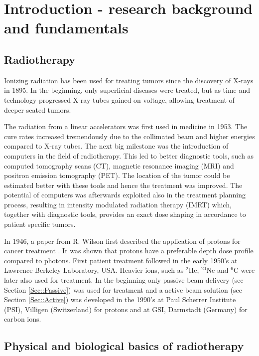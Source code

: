 \chapter{Introduction - research background and fundamentals}
\label{chapter:intro}
\minitoc

\section{Radiotherapy}

Ionizing radiation has been used for treating tumors since the discovery of X-rays in 1895. In the beginning, only superficial diseases were treated, but as time and technology progressed X-ray tubes gained on voltage, allowing treatment of deeper seated tumors.

The radiation from a linear accelerators was first used in medicine in 1953. The cure rates increased tremendously due to the collimated beam and higher energies compared to X-ray tubes. The next big milestone was the introduction of computers in the field
of radiotherapy. This led to better diagnostic tools, such as computed tomography scans (CT), magnetic resonance imaging (MRI) and
positron emission tomography (PET). The location of the tumor could be estimated better with these tools and hence the treatment was improved. The potential of computers was afterwards exploited also in the treatment planning process, resulting in intensity modulated
radiation therapy (IMRT) which, together with diagnostic tools, provides an exact dose shaping in accordance to patient specific tumors.

In 1946, a paper from R. Wilson first described the application of protons for cancer treatment \cite{Wilson1946}. It was shown that protons have a preferable depth dose profile compared to photons. First patient treatment followed in the early 1950's at Lawrence Berkeley Laboratory, USA. Heavier ions, such as 
$^{2}$He, $^{20}$Ne and $^6$C were later also used for treatment. In the beginning only passive beam delivery (see Section \ref{Sec::Passive}) was used for treatment and a active beam solution (see Section \ref{Sec::Active}) was developed in the 1990's at Paul Scherrer Institute (PSI), Villigen (Switzerland) for protons and at GSI, Darmstadt (Germany) for carbon ions.


\section{Physical and biological basics of radiotherapy}

